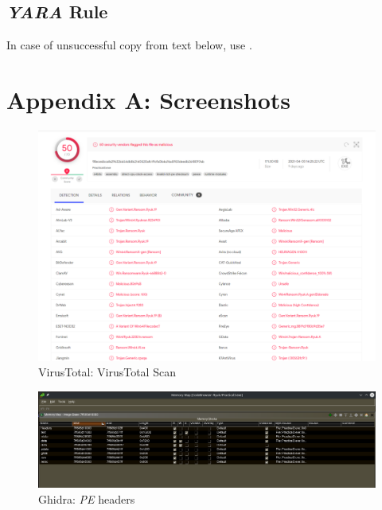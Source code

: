 \documentclass[10pt,a4paper]{article}
\begin{document}
	\subsection{\textit{YARA} Rule}
	In case of unsuccessful copy from text below, use \cite{yara}.
		

\newpage
\section{Appendix A: Screenshots}
\begin{figure}[!htbp]%
	\centering
	\includegraphics[width=\columnwidth]{pics/virustotal.png}
	\caption{VirusTotal: VirusTotal Scan}
	\label{virustotal}
\end{figure}

\begin{figure}[!htbp]%
	\centering
	\includegraphics[width=\columnwidth]{pics/peHeaders.png}
	\caption{Ghidra: \textit{PE} headers}
	\label{peHeaders}
\end{figure}
\end{document}
